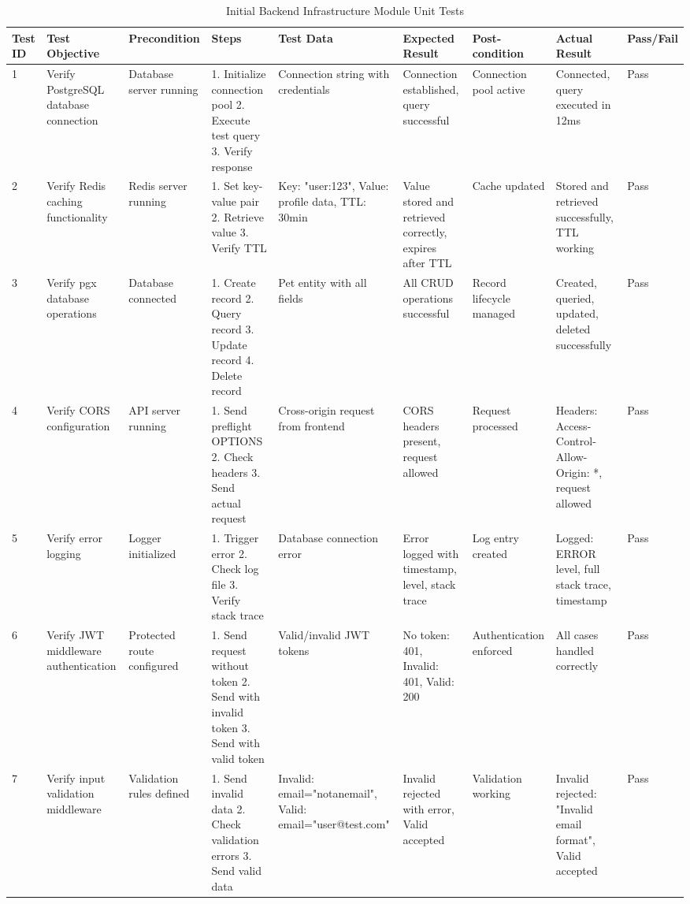\begin{table}[H]
\centering
\caption{Initial Backend Infrastructure Module Unit Tests}
\tiny
\begin{tabular}{|p{0.4cm}|p{2cm}|p{1.2cm}|p{2cm}|p{2cm}|p{2cm}|p{1.5cm}|p{2cm}|p{0.7cm}|}
\hline
\textbf{Test ID} & \textbf{Test Objective} & \textbf{Precondition} & \textbf{Steps} & \textbf{Test Data} & \textbf{Expected Result} & \textbf{Post-condition} & \textbf{Actual Result} & \textbf{Pass/Fail} \\ \hline
1 & Verify PostgreSQL database connection & Database server running & 1. Initialize connection pool 2. Execute test query 3. Verify response & Connection string with credentials & Connection established, query successful & Connection pool active & Connected, query executed in 12ms & Pass \\ \hline
2 & Verify Redis caching functionality & Redis server running & 1. Set key-value pair 2. Retrieve value 3. Verify TTL & Key: "user:123", Value: profile data, TTL: 30min & Value stored and retrieved correctly, expires after TTL & Cache updated & Stored and retrieved successfully, TTL working & Pass \\ \hline
3 & Verify pgx database operations & Database connected & 1. Create record 2. Query record 3. Update record 4. Delete record & Pet entity with all fields & All CRUD operations successful & Record lifecycle managed & Created, queried, updated, deleted successfully & Pass \\ \hline
4 & Verify CORS configuration & API server running & 1. Send preflight OPTIONS 2. Check headers 3. Send actual request & Cross-origin request from frontend & CORS headers present, request allowed & Request processed & Headers: Access-Control-Allow-Origin: *, request allowed & Pass \\ \hline
5 & Verify error logging & Logger initialized & 1. Trigger error 2. Check log file 3. Verify stack trace & Database connection error & Error logged with timestamp, level, stack trace & Log entry created & Logged: ERROR level, full stack trace, timestamp & Pass \\ \hline
6 & Verify JWT middleware authentication & Protected route configured & 1. Send request without token 2. Send with invalid token 3. Send with valid token & Valid/invalid JWT tokens & No token: 401, Invalid: 401, Valid: 200 & Authentication enforced & All cases handled correctly & Pass \\ \hline
7 & Verify input validation middleware & Validation rules defined & 1. Send invalid data 2. Check validation errors 3. Send valid data & Invalid: email="notanemail", Valid: email="user@test.com" & Invalid rejected with error, Valid accepted & Validation working & Invalid rejected: "Invalid email format", Valid accepted & Pass \\ \hline
\end{tabular}
\label{tab:backend_tests}
\end{table}

